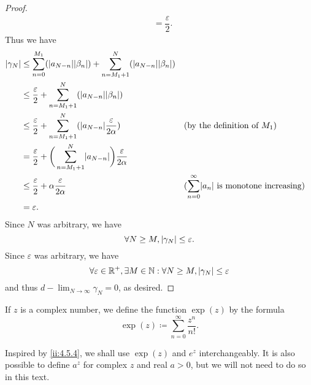 \begin{proof}
\begin{align*}
                                                       & = \dfrac{\varepsilon}{2}.
  \end{align*}
  Thus we have
  \begin{align*}
    \abs{\gamma_N} & \leq \sum_{n = 0}^{M_1} (\abs{a_{N - n}} \abs{\beta_n}) + \sum_{n = M_1 + 1}^N (\abs{a_{N - n}} \abs{\beta_n})                                                                        \\
                   & \leq \dfrac{\varepsilon}{2} + \sum_{n = M_1 + 1}^N (\abs{a_{N - n}} \abs{\beta_n})                                                                                                    \\
                   & \leq \dfrac{\varepsilon}{2} + \sum_{n = M_1 + 1}^N (\abs{a_{N - n}} \dfrac{\varepsilon}{2 \alpha})             &  & \text{(by the definition of \(M_1\))}                             \\
                   & = \dfrac{\varepsilon}{2} + \bigg(\sum_{n = M_1 + 1}^N \abs{a_{N - n}}\bigg) \dfrac{\varepsilon}{2 \alpha}                                                                             \\
                   & \leq \dfrac{\varepsilon}{2} + \alpha \dfrac{\varepsilon}{2 \alpha}                                             &  & \text{(\(\sum_{n = 0}^\infty \abs{a_n}\) is monotone increasing)} \\
                   & = \varepsilon.
  \end{align*}
  Since \(N\) was arbitrary, we have
  \[
    \forall N \geq M, \left\lvert\gamma_N\right\rvert \leq \varepsilon.
  \]
  Since \(\varepsilon\) was arbitrary, we have
  \[
    \forall \varepsilon \in \mathbb{R}^+, \exists M \in \mathbb{N} : \forall N \geq M, \left\lvert\gamma_N\right\rvert \leq \varepsilon
  \]
  and thus \(d - \lim_{N \to \infty} \gamma_N = 0\), as desired.
\end{proof}

\begin{defn}\label{ii:4.6.15}
  If \(z\) is a complex number, we define the function \(\exp(z)\) by the formula
  \[
    \exp(z) \coloneqq \sum_{n = 0}^\infty \dfrac{z^n}{n!}.
  \]
\end{defn}

\begin{note}
  Inspired by \cref{ii:4.5.4}, we shall use \(\exp(z)\) and \(e^z\) interchangeably.
  It is also possible to define \(a^z\) for complex \(z\) and real \(a > 0\), but we will not need to do so in this text.
\end{note}

